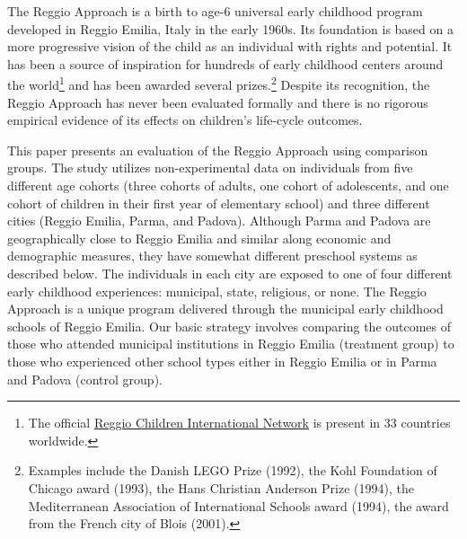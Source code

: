 The Reggio Approach is a birth to age-6 universal early childhood program developed in Reggio Emilia, Italy in the early 1960s. Its foundation is based on a more progressive vision of the child as an individual with rights and potential. It has been a source of inspiration for hundreds of early childhood centers around the world\footnote{The official \href{http://www.reggiochildren.it/network/?lang=en}{Reggio Children International Network} is present in 33 countries worldwide.} and has been awarded several prizes.\footnote{Examples include the Danish LEGO Prize (1992), the Kohl Foundation of Chicago award (1993), the Hans Christian Anderson Prize (1994), the Mediterranean Association of International Schools award (1994), the award from the French city of Blois (2001).} Despite its recognition, the Reggio Approach has never been evaluated formally and there is no rigorous empirical evidence of its effects on children's life-cycle outcomes.

This paper presents an evaluation of the Reggio Approach using comparison groups. The study utilizes non-experimental data on individuals from five different age cohorts (three cohorts of adults, one cohort of adolescents, and one cohort of children in their first year of elementary school) and three different cities (Reggio Emilia, Parma, and Padova). Although Parma and Padova are geographically close to Reggio Emilia and similar along economic and demographic measures, they have somewhat different preschool systems as described below. The individuals in each city are exposed to one of four different early childhood experiences: municipal, state, religious, or none. The Reggio Approach is a unique program delivered through the municipal early childhood schools of Reggio Emilia. Our basic strategy involves comparing the outcomes of those who attended municipal institutions in Reggio Emilia (treatment group) to those who experienced other school types either in Reggio Emilia or in Parma and Padova (control group).

